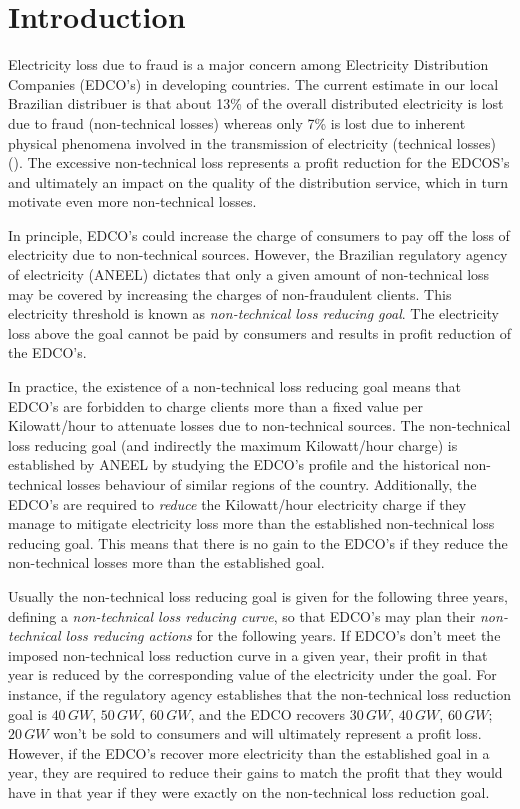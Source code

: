 \section{Introduction}
Electricity loss due to fraud is a major concern among Electricity Distribution Companies (EDCO's) in developing countries. 
The current estimate in our local Brazilian distribuer is that about 13\% of the overall distributed electricity is lost due to fraud (non-technical losses)
whereas only 7\% is lost due to inherent physical phenomena involved in the transmission of electricity (technical losses) (\cite{ANEEL2012}). 
The excessive non-technical loss represents a profit reduction for the
EDCOS's and ultimately an impact on the quality of the distribution service, which in turn motivate even more non-technical losses.

In principle, EDCO's could increase the charge of consumers to pay off the loss of electricity due to non-technical sources.
However, the Brazilian regulatory agency of electricity (ANEEL) dictates that only a given amount of non-technical loss
may be covered by increasing the charges of non-fraudulent clients. 
This electricity threshold is known as \textit{non-technical loss reducing goal}.
The electricity loss above the goal cannot be paid by consumers and results in profit reduction of the EDCO's.

In practice, the existence of a non-technical loss reducing goal means that EDCO's are forbidden to charge clients more than a fixed value per Kilowatt/hour to
attenuate losses due to non-technical sources.
The non-technical loss reducing goal (and indirectly the maximum Kilowatt/hour charge) is established by ANEEL by studying the EDCO's 
profile and the historical non-technical losses behaviour of similar regions of the country.
Additionally, the EDCO's are required to \textit{reduce} the Kilowatt/hour electricity charge if they manage to mitigate
electricity loss more than the established non-technical loss reducing goal. 
This means that there is no gain to the EDCO's if they reduce the non-technical losses more than the established goal.

Usually the non-technical loss reducing goal is given for the following three years,
defining a \textit{non-technical loss reducing curve},
so that EDCO's may plan their \textit{non-technical loss reducing actions} for the
following years.
If EDCO's don't meet the imposed non-technical loss reduction curve in a given year, their profit in that year
is reduced by the corresponding value of the electricity under the goal. For instance, if the regulatory
agency establishes that the non-technical loss reduction goal is $40\,GW$, $50\,GW$, $60\,GW$, and the EDCO recovers $30\,GW$, $40\,GW$, $60\,GW$;
$20\,GW$ won't be sold to consumers and will ultimately represent a profit loss.
However, if the EDCO's recover more electricity than the established goal in a year,
they are required to reduce their gains to match the profit that they would have in that year if they were exactly
on the non-technical loss reduction goal.

